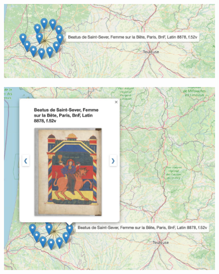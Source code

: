 \begin{landscape}
	\begin{figure}[p]
		\centering
		\centering
		\begin{minipage}{0.65\linewidth} %
			\centering
			\begin{minipage}{\linewidth}
				\centering
				\includegraphics[scale=0.15]{./textes/chap2/info-bulle.jpg}
				\label{fig:info1}
			\end{minipage}
			\par\bigskip
			\begin{minipage}{\linewidth}
				\centering
				\includegraphics[scale=0.15]{./textes/chap2/carrousel-1.jpg}
				\label{fig:carrousel1}
			\end{minipage}
			\par\bigskip
			\begin{minipage}{\linewidth}
				\centering

\end{minipage}
\end{minipage}
\end{figure}
\end{landscape}

